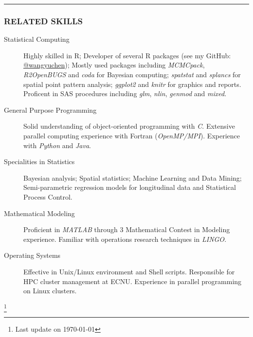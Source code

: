 \documentclass[11pt]{article}
\newcommand{\CPP}
{C\nolinebreak[4]\hspace{-.05em}\raisebox{.22ex}{\footnotesize\bf ++}}
\begin{document}
	\vspace{0.2em}
	\hrule

	\subsubsection*{\centering RELATED SKILLS}
	\vspace{-.3em}

	\begin{description}
		\item[Statistical Computing] Highly skilled in R; Developer of several R packages (see my GitHub: \href{https://www.github.com/wangyuchen}{@wangyuchen}); Mostly used packages including \emph{MCMCpack}, \emph{R2OpenBUGS} and \emph{coda} for Bayesian computing; \emph{spatstat} and \emph{splancs} for spatial point pattern analysis; \emph{ggplot2} and \emph{knitr} for graphics and reports. Proficent in SAS procedures including \emph{glm}, \emph{nlin}, \emph{genmod} and \emph{mixed}.
		\item[General Purpose Programming] Solid understanding of object-oriented programming with \emph{\CPP}. Extensive parallel computing experience with Fortran (\emph{OpenMP/MPI}). Experience with \emph{Python} and \emph{Java}.
		\item[Specialities in Statistics] Bayesian analysis; Spatial statistics; Machine Learning and Data Mining; Semi-parametric regression models for longitudinal data and Statistical Process Control.
		\item[Mathematical Modeling] Proficient in \emph{MATLAB} through 3 Mathematical Contest in Modeling experience. Familiar with operations research techniques in \emph{LINGO}.
		\item[Operating Systems] Effective in Unix/Linux environment and Shell scripts. Responsible for HPC cluster management at ECNU. Experience in parallel programming on Linux clusters.
	\end{description}


\let\thefootnote\relax\footnote{Last update on \today}
\end{document}
